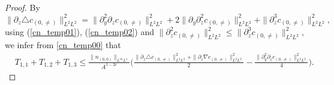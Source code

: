 \documentclass[12pt, reqno]{amsart}
\numberwithin{equation}{section}
\begin{document}
\begin{proof}
		By $\|\partial_z\triangle c_{(0,\neq)}\|_{L^2L^2}^2=
		\|\partial_y^2\partial_z c_{(0,\neq)}\|_{L^2L^2}^2
		+2\|\partial_y\partial_z^2 c_{(0,\neq)}\|_{L^2L^2}^2
		+\|\partial_z^3 c_{(0,\neq)}\|_{L^2L^2}^2,$
		using (\ref{cn_temp01}), (\ref{cn_temp02}) and  
		$\|\partial_z^2c_{(0,\neq)}\|_{L^2L^2}^2
		\leq \|\partial_z^3c_{(0,\neq)}\|_{L^2L^2}^2,$
		we infer from \eqref{cn_temp00} that 
		\begin{equation*}
			\begin{aligned}
				&T_{1,1}+T_{1,2}+T_{1,3}\leq \frac{\|n_{(0,0)}\|_{L^\infty 	L^1}}{A^{1-2\epsilon}}
				\Big(\frac{\|\partial_z\triangle c_{(0,\neq)}\|_{L^2L^2}^2
					+\|\partial_z\nabla c_{(0,\neq)}\|_{L^2L^2}^2
				}{2}-\frac{\|\partial_y^2\partial_z c_{(0,\neq)}
					\|_{L^2L^2}^2}{4}\Big).
			\end{aligned}
		\end{equation*}
		

\end{proof}
\end{document}
